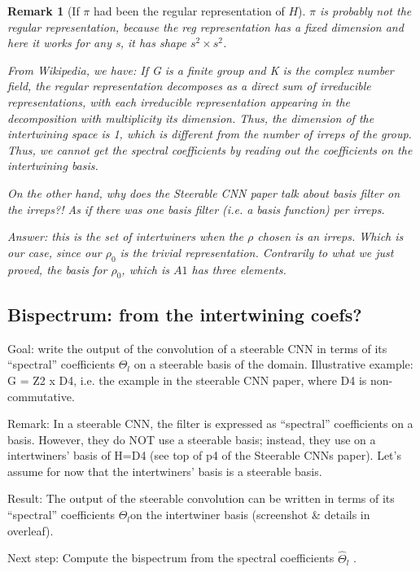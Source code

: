 \documentclass{article}
\newtheorem{remark}{Remark}
\begin{document}
\begin{remark}[If $\pi$ had been the regular representation of $H$]
$\pi$ is probably not the regular representation, because the reg representation has a fixed dimension and here it works for any s, it has shape $s^2 \times s^2$.

From Wikipedia, we have: If G is a finite group and K is the complex number field, the regular representation decomposes as a direct sum of irreducible representations, with each irreducible representation appearing in the decomposition with multiplicity its dimension. Thus, the dimension of the intertwining space is 1, which is different from the number of irreps of the group. Thus, we cannot get the spectral coefficients by reading out the coefficients on the intertwining basis.

On the other hand, why does the Steerable CNN paper talk about basis filter on the irreps?! As if there was one basis filter (i.e. a basis function) per irreps.

Answer: this is the set of intertwiners when the $\rho$ chosen is an irreps. Which is our case, since our $\rho_0$ is the trivial representation. Contrarily to what we just proved, the basis for $\rho_0$, which is $A1$ has three elements.
\end{remark}

\subsection{Bispectrum: from the intertwining coefs?}

Goal: write the output of the convolution of a steerable CNN in terms of its “spectral” coefficients $\hat \Theta_l$ on a steerable basis of the domain.
Illustrative example: G = Z2 x D4, i.e. the example in the steerable CNN paper, where D4 is non-commutative.

Remark: In a steerable CNN, the filter is expressed as “spectral” coefficients on a basis.
However, they do NOT use a steerable basis;
instead, they use on a intertwiners’ basis of H=D4 (see top of p4 of the Steerable CNNs paper).
Let’s assume for now that the intertwiners’ basis is a steerable basis.

Result: The output of the steerable convolution can be written in terms of its “spectral” coefficients $\hat \Theta_l$on the intertwiner basis (screenshot & details in overleaf).

Next step: Compute the bispectrum from the spectral coefficients $\hat \Theta_l$ .
\end{document}
